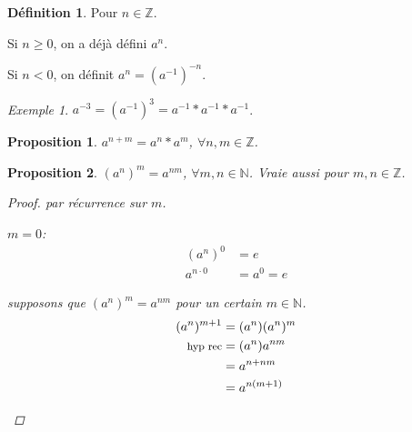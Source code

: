 \documentclass{report}
\newcommand*{\gte}{\geqslant}
\newcommand*{\entiers}{\mathbb{Z}}
\newcommand*{\naturels}{\mathbb{N}}
\newtheorem*{prop}{Proposition}
\theoremstyle{definition}
\newtheorem*{defin}{D\'efinition}
\theoremstyle{remark}
\newtheorem*{exem}{Exemple}
\begin{document}
	\begin{defin}
		Pour $n \in \entiers$.

		Si $n \gte 0$, on a d\'ej\`a d\'efini $a^n$.

		Si $n<0$, on d\'efinit $a^n=(a^{-1})^{-n}$.
	\end{defin}
	\begin{exem}
		$a^{-3}=(a^{-1})^3=a^{-1}*a^{-1}*a^{-1}$.
	\end{exem}
	\begin{prop}
		$a^{n+m}=a^n*a^m$, $\forall n,m \in \entiers$.
	\end{prop}
	\begin{prop}
		$(a^n)^m=a^{nm}$, $\forall m,n \in \naturels$. Vraie aussi pour $m,n \in \entiers$.
		\begin{proof}
			par r\'ecurrence sur $m$.

		\begin{nlist}
			\item $m=0$:
			\begin{align*}
				(a^n)^0&= e\\
				a^{n \cdot 0}&= a^0=e
			\end{align*}
			\item supposons que $(a^n)^m=a^{nm}$ pour un certain $m \in \naturels$.
			\begin{align*}
				(a^n)^{m+1}&= (a^n)(a^n)^m\\
				\text{\footnotesize hyp rec}&= (a^n)a^{nm}\\
				&= a^{n+nm}\\
				&= a^{n(m+1)}
			\end{align*}
		\end{nlist}
		\end{proof}
	\end{prop}
\end{document}
